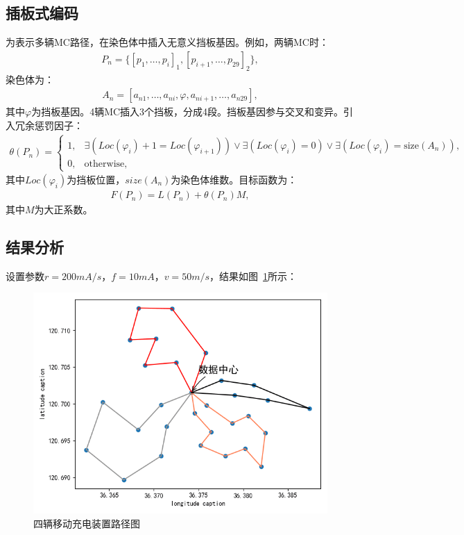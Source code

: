 \documentclass{whutmod}
\begin{document}
        \subsection{插板式编码}
            为表示多辆MC路径，在染色体中插入无意义挡板基因。例如，两辆MC时：
            \begin{gather*}
                P_n = \{[p_1, \dots, p_i]_1, [p_{i+1}, \dots, p_{29}]_2\},
            \end{gather*}
            染色体为：
            \begin{gather*}
                A_n = [a_{n1}, \dots, a_{ni}, \varphi, a_{ni+1}, \dots, a_{n29}],
            \end{gather*}
            其中$\varphi$为挡板基因。4辆MC插入3个挡板，分成4段。挡板基因参与交叉和变异。引入冗余惩罚因子：
            \begin{gather}
                \theta(P_n) = \left\{
                \begin{matrix}
                    1, & \exists (Loc(\varphi_i) + 1 = Loc(\varphi_{i+1})) \vee \exists (Loc(\varphi_i) = 0) \vee \exists (Loc(\varphi_i) = \text{size}(A_n)), \\
                    0, & \text{otherwise},
                \end{matrix}
                \right.
            \end{gather}
            其中$Loc(\varphi_i)$为挡板位置，$size(A_n)$为染色体维数。目标函数为：
            \begin{gather}
                F(P_n) = L(P_n) + \theta(P_n) M,
            \end{gather}
            其中$M$为大正系数。

        \subsection{结果分析}
            设置参数$r=200mA/s$，$f=10mA$，$v=50m/s$，结果如图~\ref{gdfsdf}所示：

            \begin{figure}[H]
                \centering
                \includegraphics[width=.8\textwidth]{figures/s3.png}
                \caption{四辆移动充电装置路径图}\label{gdfsdf}
            \end{figure}
\end{document}
